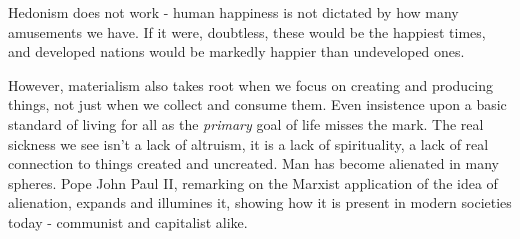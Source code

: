 \documentclass[letterpaper]{article}
\begin{document}
Hedonism does not work - human happiness is not dictated by how many amusements we have. If it were, doubtless, these would be the happiest times, and developed nations would be markedly happier than undeveloped ones.

However, materialism also takes root when we focus on creating and producing things, not just when we collect and consume them. Even insistence upon a basic standard of living for all as the \textit{primary} goal of life misses the mark. The real sickness we see isn't a lack of altruism, it is a lack of spirituality, a lack of real connection to things created and uncreated. Man has become alienated in many spheres. Pope John Paul II, remarking on the Marxist application of the idea of alienation, expands and illumines it, showing how it is present in modern societies today - communist and capitalist alike.
\end{document}
